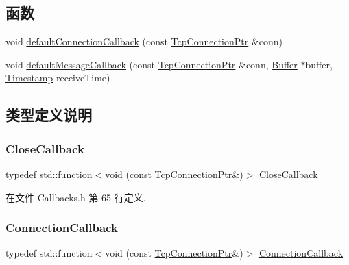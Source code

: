 \subsection*{函数}
\begin{DoxyCompactItemize}
\item 
void \hyperlink{namespacemuduo_1_1net_a74d4cd57249902f889bfecb4bad7847d}{default\+Connection\+Callback} (const \hyperlink{namespacemuduo_1_1net_ab91a46e9290926aa692450e46cfc9039}{Tcp\+Connection\+Ptr} \&conn)
\item 
void \hyperlink{namespacemuduo_1_1net_abea01f500af8f956edd6649639937508}{default\+Message\+Callback} (const \hyperlink{namespacemuduo_1_1net_ab91a46e9290926aa692450e46cfc9039}{Tcp\+Connection\+Ptr} \&conn, \hyperlink{classmuduo_1_1net_1_1Buffer}{Buffer} $\ast$buffer, \hyperlink{classmuduo_1_1Timestamp}{Timestamp} receive\+Time)
\end{DoxyCompactItemize}


\subsection{类型定义说明}
\mbox{\label{namespacemuduo_1_1net_a5a393be65a093bad5f5a6b8340ce8c88}} 
\subsubsection{\texorpdfstring{Close\+Callback}{CloseCallback}}
{\footnotesize\ttfamily typedef std\+::function$<$void (const \hyperlink{namespacemuduo_1_1net_ab91a46e9290926aa692450e46cfc9039}{Tcp\+Connection\+Ptr}\&)$>$ \hyperlink{namespacemuduo_1_1net_a5a393be65a093bad5f5a6b8340ce8c88}{Close\+Callback}}



在文件 Callbacks.\+h 第 65 行定义.

\mbox{\label{namespacemuduo_1_1net_a78754792e997a13cb10908eb7ec508b2}} 
\subsubsection{\texorpdfstring{Connection\+Callback}{ConnectionCallback}}
{\footnotesize\ttfamily typedef std\+::function$<$void (const \hyperlink{namespacemuduo_1_1net_ab91a46e9290926aa692450e46cfc9039}{Tcp\+Connection\+Ptr}\&)$>$ \hyperlink{namespacemuduo_1_1net_a78754792e997a13cb10908eb7ec508b2}{Connection\+Callback}}



